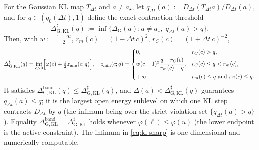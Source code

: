 \begin{proposition}
\label{prop:kl-sharp}
For the Gaussian KL map $T_{\Delta t}$ and $a\neq a_\star$, let
$q_{\Delta t}(a):=D_{\Delta t}(T_{\Delta t}a)/D_{\Delta t}(a)$, and for $q\in(q_0(\Delta t),1)$
define the exact contraction threshold
\[
    \Delta_{\mathrm{G,KL}}^\sharp(q):=\inf\{\Delta_{\mathrm G}(a):a\neq a_\star,\;q_{\Delta t}(a)>q\}.
\]
Then, with $w:=\tfrac{1+\Delta t}2$, $r_m(c)=(1-\Delta t\,c)^2$, $r_C(c)=(1+\Delta t\,c)^{-2}$,
\begin{equation}
\label{eq:kl-sharp}
    \Delta_{\mathrm{G,KL}}^\sharp(q)=\inf_{c>0}\Bigl[\varphi(c)+\tfrac12z_{\min}(c;q)\Bigr],
    \quad
    z_{\min}(c;q)=
    \begin{cases}
    0, & r_C(c)>q,\\[2pt]
    w(c-1)^2\dfrac{q-r_C(c)}{r_m(c)-q}, & r_C(c)\leq q<r_m(c),\\[8pt]
    +\infty, & r_m(c)\leq q\ \text{and}\ r_C(c)\leq q .
    \end{cases}
\end{equation}
It satisfies $\Delta_{\mathrm{G,KL}}^{\mathrm{band}}(q)\leq\Delta_{\mathrm{G,KL}}^\sharp(q)$,
and $\Delta(a)<\Delta_{\mathrm{G,KL}}^\sharp(q)$ guarantees $q_{\Delta t}(a)\leq q$; it is the
largest open energy sublevel on which one KL step contracts $D_{\Delta t}$ by $q$ (the
infimum being over the strict-violation set $\{q_{\Delta t}(a)>q\}$). Equality
$\Delta_{\mathrm{G,KL}}^{\mathrm{band}}=\Delta_{\mathrm{G,KL}}^\sharp$ holds whenever
$\varphi(\ell)\leq\varphi(u)$ (the lower endpoint is the active constraint). The infimum in
\eqref{eq:kl-sharp} is one-dimensional and numerically computable.
\end{proposition}

